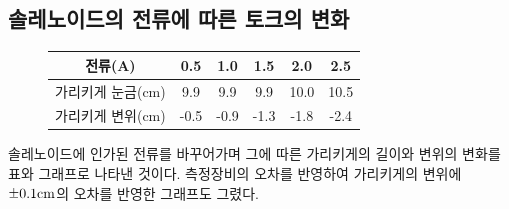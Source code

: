 \documentclass[a4paper]{article}
\newcommand{\mypm}{\mathbin{\smash{%
\raisebox{0.35ex}{%
            $\underset{\raisebox{0.5ex}{$\smash -$}}{\smash+}$%
            }%
        }%
    }%
}
\begin{document}
		\subsection{솔레노이드의 전류에 따른 토크의 변화}

		\begin{figure}[h]
			\centering
				\begin{tabular}{cccccc} 
					\hline \hline
					전류(A) \qquad \qquad \vline & 0.5 & 1.0 & 1.5 & 2.0 & 2.5 \\
					\hline
					가리키게 눈금(\si{cm}) \vline & 9.9 & 9.9 & 9.9 & 10.0 & 10.5 \\
					\hline
					가리키게 변위(\si{cm}) \vline & -0.5 & -0.9 & -1.3 & -1.8 & -2.4 \\
					\hline \hline
				\end{tabular}  
			\label{tb:soloutput}
		\end{figure}

		\vspace{-0.5cm}
		
		\begin{figure}[h]
			\centering
		\end{figure}
		솔레노이드에 인가된 전류를 바꾸어가며 그에 따른 가리키게의 길이와 변위의 변화를 표와 그래프로 나타낸 것이다.
		측정장비의 오차를 반영하여 가리키게의 변위에 $\mypm{}0.1\si{cm}$의 오차를 반영한 그래프도 그렸다.
\end{document}
